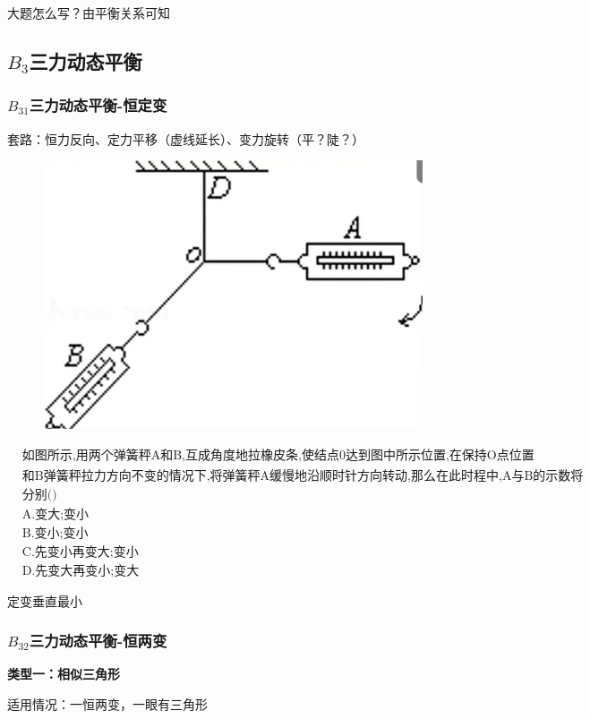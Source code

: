\documentclass[lang=cn,10pt]{elegantbook}
\begin{document}
	大题怎么写？由平衡关系可知
	\subsection{$B_{3}$三力动态平衡}
	\subsubsection{$B_{31}$三力动态平衡-恒定变}
	套路：恒力反向、定力平移（虚线延长）、变力旋转（平？陡？）
	
	\begin{example}
		\begin{figure}[H]
			\centering
			\includegraphics[width=0.4\linewidth]{image/24}
		\end{figure}
		
		$\begin{aligned}&\text{如图所示,用两个弹簧秤A和B,互成角度地拉}\text{橡皮条,使结点0达到图中所示位置,在保持O点位置}\\&\text{和B弹簧秤拉力方向不变的情况下,将弹簧秤A缓慢地}\text{沿顺时针方向转动,那么在此时程中,A与B的示数将}\\&\text{分别()}\\&\text{A.变大;变小}\\&\text{B.变小;变小}\\&\text{C.先变小再变大;变小}\\&\text{D.先变大再变小;变大}\end{aligned}$
	\end{example}
	\begin{conclusion}
		定变垂直最小
	\end{conclusion}
	
	\subsubsection{$B_{32}$三力动态平衡-恒两变}
	
	\textbf{类型一：相似三角形}
	
	适用情况：一恒两变，一眼有三角形
	
\end{document}
